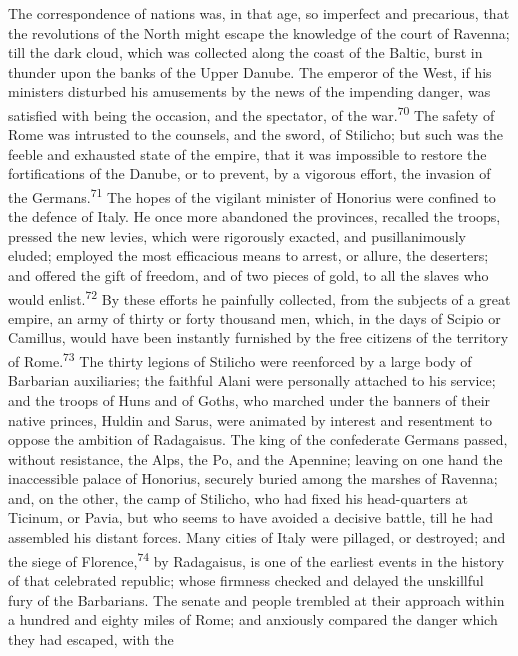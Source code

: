 The correspondence of nations was, in that age, so imperfect and
precarious, that the revolutions of the North might escape the
knowledge of the court of Ravenna; till the dark cloud, which was
collected along the coast of the Baltic, burst in thunder upon
the banks of the Upper Danube. The emperor of the West, if his
ministers disturbed his amusements by the news of the impending
danger, was satisfied with being the occasion, and the spectator,
of the war.\textsuperscript{70} The safety of Rome was intrusted to the counsels,
and the sword, of Stilicho; but such was the feeble and exhausted
state of the empire, that it was impossible to restore the
fortifications of the Danube, or to prevent, by a vigorous
effort, the invasion of the Germans.\textsuperscript{71} The hopes of the vigilant
minister of Honorius were confined to the defence of Italy. He
once more abandoned the provinces, recalled the troops, pressed
the new levies, which were rigorously exacted, and
pusillanimously eluded; employed the most efficacious means to
arrest, or allure, the deserters; and offered the gift of
freedom, and of two pieces of gold, to all the slaves who would
enlist.\textsuperscript{72} By these efforts he painfully collected, from the
subjects of a great empire, an army of thirty or forty thousand
men, which, in the days of Scipio or Camillus, would have been
instantly furnished by the free citizens of the territory of
Rome.\textsuperscript{73} The thirty legions of Stilicho were reenforced by a
large body of Barbarian auxiliaries; the faithful Alani were
personally attached to his service; and the troops of Huns and of
Goths, who marched under the banners of their native princes,
Huldin and Sarus, were animated by interest and resentment to
oppose the ambition of Radagaisus. The king of the confederate
Germans passed, without resistance, the Alps, the Po, and the
Apennine; leaving on one hand the inaccessible palace of
Honorius, securely buried among the marshes of Ravenna; and, on
the other, the camp of Stilicho, who had fixed his head-quarters
at Ticinum, or Pavia, but who seems to have avoided a decisive
battle, till he had assembled his distant forces. Many cities of
Italy were pillaged, or destroyed; and the siege of Florence,\textsuperscript{74}
by Radagaisus, is one of the earliest events in the history of
that celebrated republic; whose firmness checked and delayed the
unskillful fury of the Barbarians. The senate and people trembled
at their approach within a hundred and eighty miles of Rome; and
anxiously compared the danger which they had escaped, with the
